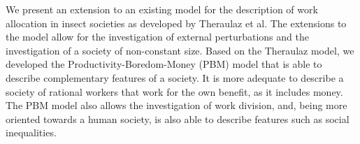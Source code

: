 We present an extension to an existing model for the description of work allocation in insect societies as developed by Theraulaz et al. The extensions to the model allow for the investigation of external perturbations and the investigation of a society of non-constant size.
Based on the Theraulaz model, we developed the Productivity-Boredom-Money (PBM) model that is able to describe complementary features of a society. It is more adequate to describe a society of rational workers that work for the own benefit, as it includes money. The PBM model also allows the investigation of work division, and, being more oriented towards a human society, is also able to describe features such as social inequalities.
